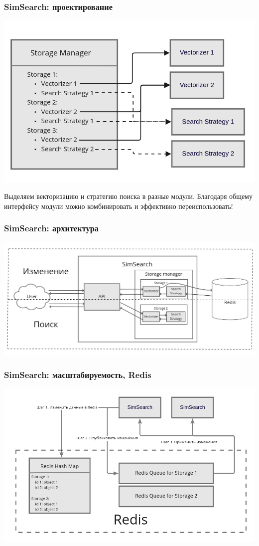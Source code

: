 \documentclass{beamer}
\begin{document}
\begin{frame}
\frametitle{SimSearch: проектирование}

\begin{center}
\includegraphics[width=0.7\linewidth]{miro_3.png}
\end{center}

Выделяем векторизацию и стратегию поиска в разные модули. Благодаря общему интерфейсу модули можно комбинировать и эффективно переиспользовать!

\end{frame}
\begin{frame}
\frametitle{SimSearch: архитектура}

\begin{center}
\includegraphics[width=\linewidth]{miro_4.png}
\end{center}

\end{frame}

\begin{frame}
\frametitle{SimSearch: масштабируемость, Redis}

\begin{center}
\includegraphics[width=\linewidth]{miro_1.png}
\end{center}

\end{frame}
\end{document}
